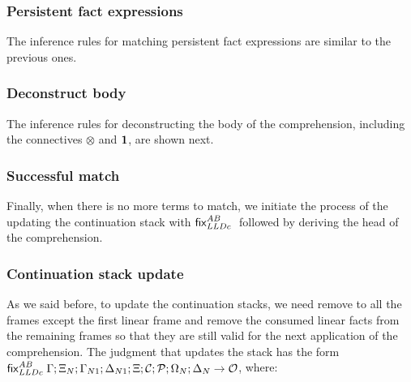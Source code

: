 \subsubsection{Persistent fact expressions}

The inference rules for matching persistent fact expressions are similar to the
previous ones.



\subsubsection{Deconstruct body}

The inference rules for deconstructing the body of the comprehension, including
the connectives $\otimes$ and $\mathbf{1}$, are shown next.



\subsubsection{Successful match}

Finally, when there is no more terms to match, we initiate the process of the
updating the continuation stack with $\mathsf{fix}_{LLDc}^{AB} \;$ followed by deriving the head of the
comprehension.



\subsubsection{Continuation stack update}

As we said before, to update the continuation stacks, we need remove to all the
frames except the first linear frame and remove the consumed linear facts from
the remaining frames so that they are still valid for the next application of
the comprehension.  The judgment that updates the stack has the form $\mathsf{fix}_{LLDc}^{AB} \;
\Gamma; \Xi_N; \Gamma_{N1}; \Delta_{N1}; \Xi; \mathcal{C}; \mathcal{P}; \Omega_N; \Delta_N
\rightarrow \mathcal{O}$, where:

